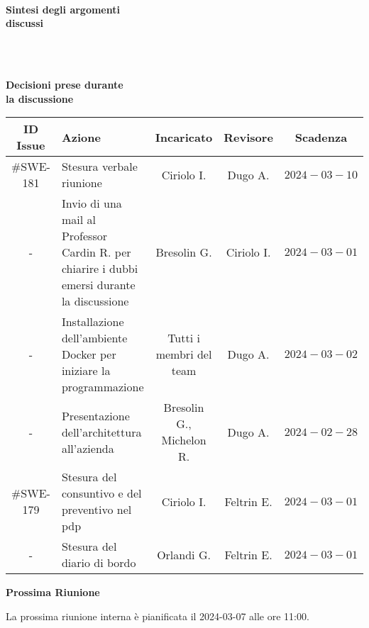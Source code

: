 \documentclass[10pt, a4paper]{article}
\title{\data}
\author{SWEetCode}
\begin{document}


\setlength{\columnsep}{2.2em}
\setlength{\columnseprule}{4pt}
\begin{paracol}{2}


\intestazione
\vspace{5.0em}

\partecipanti

\newpage

\switchcolumn
\revisioneAzioni
\vspace{19em}

\ordineGiorno

\newpage


\switchcolumn

\\
\textbf{Sintesi degli argomenti\\discussi}

~\newpage


\\
\textbf{Decisioni prese durante\\la discussione}

\switchcolumn

\discussione


\newpage

\decisioni

\end{paracol}
\vspace{5em}



{\renewcommand{\arraystretch}{1.5}
\begin{tabularx}{\textwidth}{c|X|c|c|c}
\textbf{ID Issue} & \textbf{Azione} & \textbf{Incaricato} & \textbf{Revisore} & \textbf{Scadenza} \\
\hline
\#SWE-181 & Stesura verbale riunione & Ciriolo I. & Dugo A. & $2024-03-10$ \\
\hline
- & Invio di una mail al Professor Cardin R. per chiarire i dubbi emersi durante la discussione & Bresolin G. & Ciriolo I. & $2024-03-01$ \\
\hline
- & Installazione dell'ambiente Docker per iniziare la programmazione & Tutti i membri del team & Dugo A. & $2024-03-02$ \\
\hline
- & Presentazione dell'architettura all'azienda & Bresolin G., Michelon R. & Dugo A. & $2024-02-28$ \\
\hline
\#SWE-179 & Stesura del consuntivo e del preventivo nel pdp & Ciriolo I. & Feltrin E. & $2024-03-01$ \\
\hline
- & Stesura del diario di bordo & Orlandi G. & Feltrin E. & $2024-03-01$ \\
\hline
\end{tabularx}}

\vspace{3em}


\textbf{Prossima Riunione}

La prossima riunione interna è pianificata il 2024-03-07 alle ore 11:00.
\end{document}
